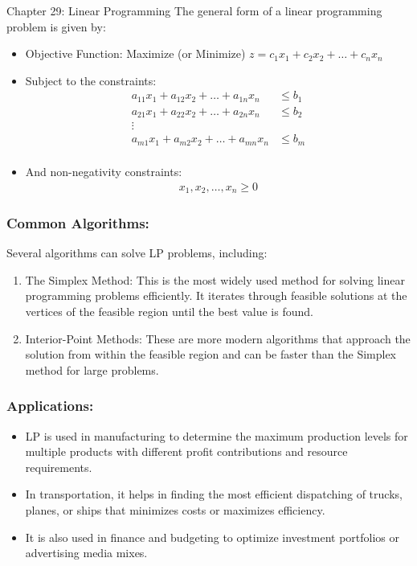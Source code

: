 \begin{notes}{Chapter 29: Linear Programming}
    The general form of a linear programming problem is given by:
    \begin{itemize}
        \item Objective Function: Maximize (or Minimize) $z = c_1x_1 + c_2x_2 + \ldots + c_nx_n$
        \item Subject to the constraints:
        \begin{align*}
        a_{11}x_1 + a_{12}x_2 + \ldots + a_{1n}x_n & \leq b_1 \\
        a_{21}x_1 + a_{22}x_2 + \ldots + a_{2n}x_n & \leq b_2 \\
        \vdots \\
        a_{m1}x_1 + a_{m2}x_2 + \ldots + a_{mn}x_n & \leq b_m \\
        \end{align*}
        \item And non-negativity constraints:
        \begin{align*}
        x_1, x_2, \ldots, x_n \geq 0
        \end{align*}
    \end{itemize}
    
    \subsubsection*{Common Algorithms:}
    
    Several algorithms can solve LP problems, including:
    \begin{enumerate}
        \item The Simplex Method: This is the most widely used method for solving linear programming problems efficiently. It iterates through feasible solutions at the vertices of the feasible region until the best value is found.
        \item Interior-Point Methods: These are more modern algorithms that approach the solution from within the feasible region and can be faster than the Simplex method for large problems.
    \end{enumerate}
    
    \subsubsection*{Applications:}
    
    \begin{itemize}
        \item LP is used in manufacturing to determine the maximum production levels for multiple products with different profit contributions and resource requirements.
        \item In transportation, it helps in finding the most efficient dispatching of trucks, planes, or ships that minimizes costs or maximizes efficiency.
        \item It is also used in finance and budgeting to optimize investment portfolios or advertising media mixes.
    \end{itemize}    
\end{notes}

